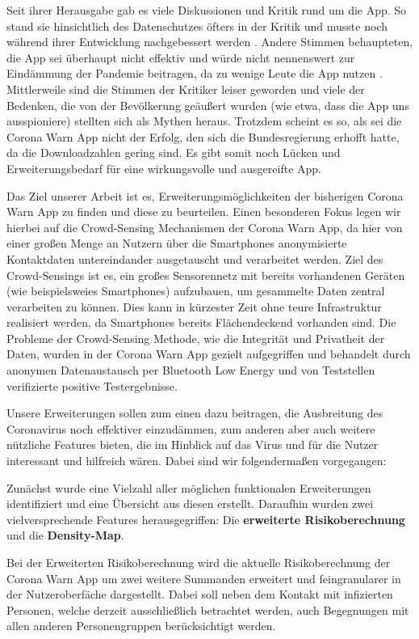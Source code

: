 \documentclass[conference,compsoc]{IEEEtran}
\begin{document}
Seit ihrer Herausgabe gab es viele Diskussionen und Kritik rund um die App. 
So stand sie hinsichtlich des Datenschutzes öfters in der Kritik und musste noch während ihrer Entwicklung nachgebessert werden \cite{CWAKritik}. 
Andere Stimmen behaupteten, die App sei überhaupt nicht effektiv und würde nicht nennenswert zur Eindämmung der Pandemie beitragen, da zu wenige Leute die App nutzen \cite{CWAKritik2}.
Mittlerweile sind die Stimmen der Kritiker leiser geworden und viele der Bedenken, die von der Bevölkerung geäußert wurden (wie etwa, dass die App uns ausspioniere) stellten sich als Mythen heraus. 
Trotzdem scheint es so, als sei die Corona Warn App nicht der Erfolg, den sich die Bundesregierung erhofft hatte, da die Downloadzahlen gering sind. \cite{Downloadzahlen} 
Es gibt somit noch Lücken und Erweiterungsbedarf für eine wirkungsvolle und ausgereifte App.

Das Ziel unserer Arbeit ist es, Erweiterungsmöglichkeiten der bisherigen Corona Warn App zu finden und diese zu beurteilen. 
Einen besonderen Fokus legen wir hierbei auf die Crowd-Sensing Mechanismen der Corona Warn App, da hier von einer großen Menge an Nutzern über die Smartphones anonymisierte Kontaktdaten untereindander ausgetauscht und verarbeitet werden.
Ziel des Crowd-Sensings ist es, ein großes Sensorennetz mit bereits vorhandenen Geräten (wie beispielsweies Smartphones) aufzubauen, um gesammelte Daten zentral verarbeiten zu können. 
Dies kann in kürzester Zeit ohne teure Infrastruktur realisiert werden, da Smartphones bereits Flächendeckend vorhanden sind.
Die Probleme der Crowd-Sensing Methode, wie die Integrität und Privatheit der Daten, wurden in der Corona Warn App gezielt aufgegriffen und behandelt durch 
anonymen Datenaustausch per Bluetooth Low Energy und von Teststellen verifizierte positive Testergebnisse.

Unsere Erweiterungen sollen zum einen dazu beitragen, die Ausbreitung des Coronavirus noch effektiver einzudämmen, 
zum anderen aber auch weitere nützliche Features bieten, die im Hinblick auf das Virus und für die Nutzer interessant und hilfreich wären.
Dabei sind wir folgendermaßen vorgegangen: 

Zunächst wurde eine Vielzahl aller möglichen funktionalen Erweiterungen identifiziert und eine Übersicht aus diesen erstellt. 
Daraufhin wurden zwei vielversprechende Features herausgegriffen: Die \textbf{erweiterte Risikoberechnung} und die \textbf{Density-Map}.

Bei der Erweiterten Risikoberechnung wird die aktuelle Risikoberechnung der Corona Warn App um zwei weitere Summanden erweitert und feingranularer in der Nutzeroberfäche dargestellt. 
Dabei soll neben dem Kontakt mit infizierten Personen, welche derzeit ausschließlich betrachtet werden, auch Begegnungen mit allen anderen Personengruppen berücksichtigt werden.
\end{document}
